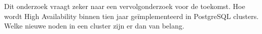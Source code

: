 Dit onderzoek vraagt zeker naar een vervolgonderzoek voor de toekomst. Hoe wordt High Availability binnen tien jaar geïmplementeerd in PostgreSQL clusters. Welke nieuwe noden in een cluster zijn er dan van belang.






